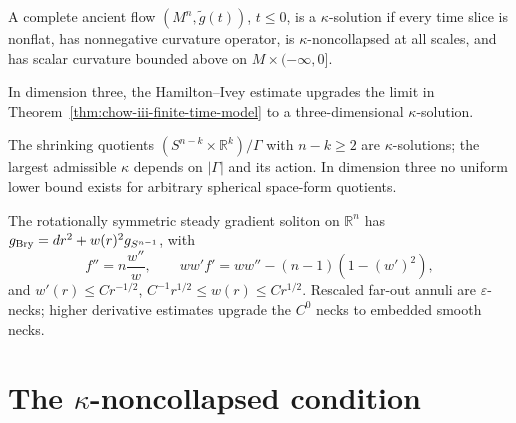 \begin{definition}
\label{def:chow-iii-kappa-solution}
A complete ancient flow $(M^n,\tilde g(t))$, $t\le0$, is a $\kappa$-solution
if every time slice is nonflat, has nonnegative curvature operator, is
$\kappa$-noncollapsed at all scales, and has scalar curvature bounded above
on $M\times(-\infty,0]$.
\end{definition}

\begin{corollary}
\label{cor:chow-iii-3d-finite-time-model}
In dimension three, the Hamilton--Ivey estimate upgrades the limit in
Theorem~\ref{thm:chow-iii-finite-time-model} to a three-dimensional
$\kappa$-solution.
\end{corollary}

\begin{example}
\label{ex:chow-iii-cylinder-kappa}
The shrinking quotients $(S^{n-k}\times\mathbb R^k)/\Gamma$ with
$n-k\ge2$ are $\kappa$-solutions; the largest admissible $\kappa$ depends on
$|\Gamma|$ and its action.  In dimension three no uniform lower bound exists
for arbitrary spherical space-form quotients.
\end{example}

\begin{example}
\label{ex:chow-iii-bryant-soliton}
The rotationally symmetric steady gradient soliton on $\mathbb R^n$ has
$g_{\rm Bry}=dr^2+w(r)^2g_{S^{n-1}}$, with
\[
f''=n\frac{w''}{w},\qquad ww'f'=ww''-(n-1)(1-(w')^2),
\]
and $w'(r)\le Cr^{-1/2}$, $C^{-1}r^{1/2}\le w(r)\le Cr^{1/2}$.  Rescaled
far-out annuli are $\varepsilon$-necks; higher derivative estimates upgrade
the $C^0$ necks to embedded smooth necks.
\end{example}

\section{\texorpdfstring{The $\kappa$-noncollapsed condition}{The Kappa-noncollapsed condition}}

